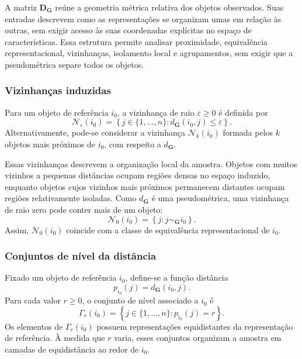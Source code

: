 A matriz $\mathbf{D}_{\mathbf{G}}$ reúne a geometria métrica relativa dos
objetos observados. Suas entradas descrevem como as representações se
organizam umas em relação às outras, sem exigir acesso às suas coordenadas
explícitas no espaço de características. Essa estrutura permite analisar
proximidade, equivalência representacional, vizinhanças, isolamento local e
agrupamentos, sem exigir que a pseudométrica separe todos os objetos.

\subsubsection*{Vizinhanças induzidas}

Para um objeto de referência $i_0$, a vizinhança de raio
$\varepsilon\geq 0$ é definida por
\begin{equation}\label{eq:epsilon_neighborhood}
    \mathcal{N}_{\varepsilon}(i_0)
    =
    \left\{
        j\in\{1,\dots,n\}
        :
        d_{\mathbf{G}}(i_0,j)
        \leq
        \varepsilon
    \right\}.
\end{equation}
Alternativamente, pode-se considerar a vizinhança
$\mathcal{N}_k(i_0)$ formada pelos $k$ objetos mais próximos de $i_0$,
com respeito a $d_{\mathbf{G}}$.

Essas vizinhanças descrevem a organização local da amostra. Objetos com
muitos vizinhos a pequenas distâncias ocupam regiões densas no espaço
induzido, enquanto objetos cujos vizinhos mais próximos permanecem
distantes ocupam regiões relativamente isoladas. Como
$d_{\mathbf{G}}$ é uma pseudométrica, uma vizinhança de raio zero pode
conter mais de um objeto:
\begin{equation}
    \mathcal{N}_{0}(i_0)
    =
    \left\{
        j:
        j\sim_{\mathbf{G}} i_0
    \right\}.
\end{equation}
Assim, $\mathcal{N}_{0}(i_0)$ coincide com a classe de equivalência
representacional de $i_0$.

\subsubsection*{Conjuntos de nível da distância}

Fixado um objeto de referência $i_0$, define-se a função distância
\begin{equation}\label{eq:sample_distance_function}
    p_{i_0}(j)
    =
    d_{\mathbf{G}}(i_0,j).
\end{equation}
Para cada valor $r\geq 0$, o conjunto de nível associado a $i_0$ é
\begin{equation}\label{eq:sample_level_set}
    \Gamma_r(i_0)
    =
    \left\{
        j\in\{1,\dots,n\}
        :
        p_{i_0}(j)=r
    \right\}.
\end{equation}
Os elementos de $\Gamma_r(i_0)$ possuem representações equidistantes da
representação de referência. À medida que $r$ varia, esses conjuntos
organizam a amostra em camadas de equidistância ao redor de $i_0$.

